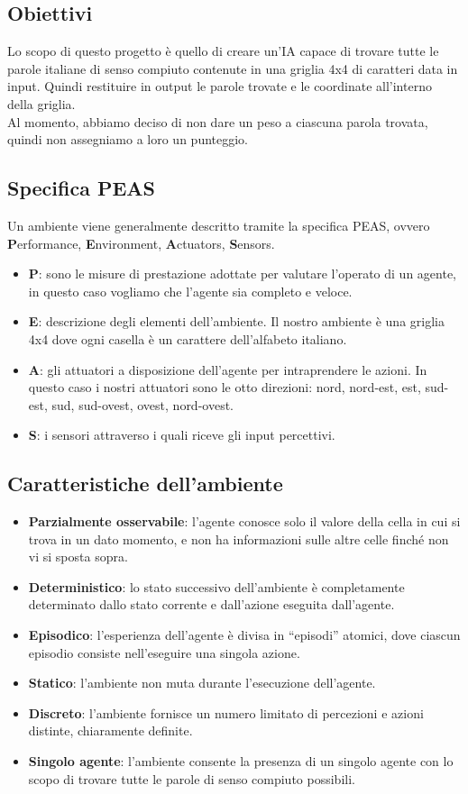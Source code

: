 \documentclass[10pt,a4paper]{article}
\begin{document}
	\subsection{Obiettivi}
	Lo scopo di questo progetto è quello di creare un'IA capace di trovare tutte le parole italiane di senso compiuto contenute in una griglia 4x4 di caratteri data in input.
	Quindi restituire in output le parole trovate e le coordinate all'interno della griglia.\\
	Al momento, abbiamo deciso di non dare un peso a ciascuna parola trovata, quindi non assegniamo a loro un punteggio.
	\subsection{Specifica PEAS}
	Un ambiente viene generalmente descritto tramite la specifica PEAS, ovvero \textbf{P}erformance, \textbf{E}nvironment, \textbf{A}ctuators, \textbf{S}ensors.
	\begin{itemize}
		\item \textbf{P}: sono le misure di prestazione adottate per valutare l’operato di un agente, in questo caso vogliamo che l'agente sia completo e veloce.
		\item \textbf{E}: descrizione degli elementi dell'ambiente. Il nostro ambiente è una griglia 4x4 dove ogni casella è un carattere dell'alfabeto italiano.
		\item \textbf{A}: gli attuatori a disposizione dell'agente per intraprendere le azioni. In questo caso i nostri attuatori sono le otto direzioni: nord, nord-est, est, sud-est, sud, sud-ovest, ovest, nord-ovest.
		\item \textbf{S}: i sensori attraverso i quali riceve gli input percettivi.
	\end{itemize}
	\subsection{Caratteristiche dell'ambiente}
	\begin{itemize}
		\item \textbf{Parzialmente osservabile}: l'agente conosce solo il valore della cella in cui si trova in un dato momento, e non ha informazioni sulle altre celle finché non vi si sposta sopra.
		\item \textbf{Deterministico}: lo stato successivo dell’ambiente è completamente determinato dallo stato corrente e dall’azione eseguita dall’agente.
		\item \textbf{Episodico}: l’esperienza dell’agente è divisa in “episodi” atomici, dove ciascun episodio consiste nell’eseguire una singola azione.
		\item \textbf{Statico}: l'ambiente non muta durante l'esecuzione dell'agente.
		\item \textbf{Discreto}: l’ambiente fornisce un numero limitato di percezioni e azioni distinte, chiaramente definite.
		\item \textbf{Singolo agente}: l'ambiente consente la presenza di  un singolo agente con lo scopo di trovare tutte le parole di senso compiuto possibili.
	\end{itemize}
\end{document}
